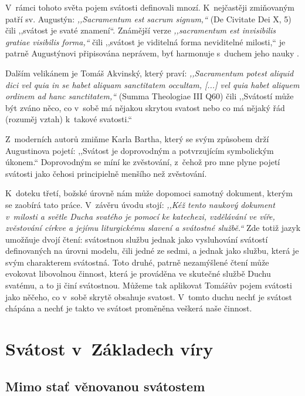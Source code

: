 V~rámci tohoto světa pojem svátosti definovali mnozí. K~nejčastěji zmiňovaným
patří sv. Augustýn: \textit{,,Sacramentum est sacrum signum,``} (De Civitate Dei
X, 5) čili ,,svátost je svaté znamení``. Známější verze
\textit{,,sacramentum est invisibilis gratiae visibilis forma,``} čili ,,svátost
je viditelná forma neviditelné milosti,`` je patrně Augustýnovi připisována
neprávem, byť harmonuje s~duchem jeho nauky \citep{king1967origin}.

Dalším velikánem je Tomáš Akvinský, který praví: \textit{,,Sacramentum potest
ali\-quid dici vel quia in se habet aliquam sanctitatem occultam, [...] vel quia
habet aliquem ordinem ad hanc sanctitatem,``} (Summa Theologiae III Q60) čili
,,Svátostí může být zváno něco, co v~sobě má nějakou skrytou svatost nebo co má
nějaký řád (rozuměj vztah) k~takové svatosti.``

Z~moderních autorů zmiňme Karla Bartha, který se svým způsobem drží Augustinova
pojetí: ,,Svátost je doprovodným a potvrzujícím symbolickým úkonem.``
\citep[I, 1]{barth1946kirchliche} Doprovodným se míní ke zvěstování, z~čehož pro
mne plyne pojetí svátosti jako čehosi principielně menšího než zvěstování.

K~doteku třetí, božské úrovně nám může dopomoci samotný dokument, kterým se
zaobírá tato práce. V~závěru úvodu stojí: \textit{,,Kéž tento naukový dokument
v~milosti a světle Ducha svatého je pomocí ke katechezi, vzdělávání ve víře,
zvěstování církve a jejímu liturgickému slavení a svátostné službě.``} Zde totiž
jazyk umožňuje dvojí čtení: svátostnou službu jednak jako vysluhování svátostí
definovaných na úrovni modelu, čili jedné ze sedmi, a jednak jako službu, která
je svým charakterem svátostná. Toto druhé, patrně nezamýšlené čtení může
evokovat libovolnou činnost, která je prováděna ve skutečné službě Duchu
svatému, a to ji činí svátostnou. Můžeme tak aplikovat Tomášův pojem svátosti
jako něčeho, co v~sobě skrytě obsahuje svatost. V~tomto duchu nechť je svátost
chápána a nechť je takto ve svátost proměněna veškerá naše činnost.

\vspace{15mm}
\chapter{Svátost v~Základech víry}
\label{div:zaklady}

\section{Mimo stať věnovanou svátostem}

